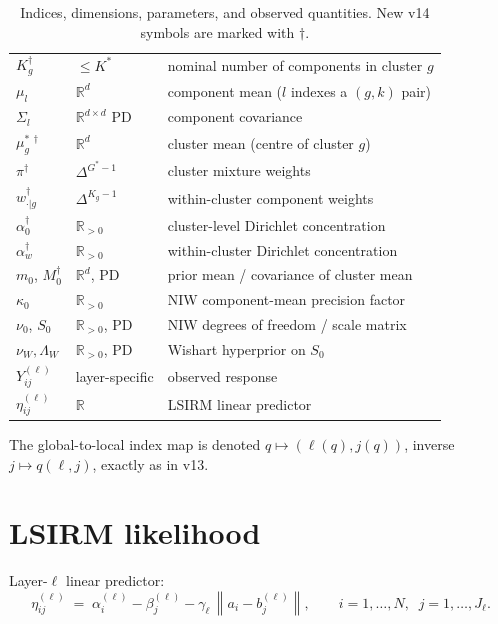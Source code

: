 \documentclass[11pt]{article}
\newcommand{\R}{\mathbb{R}}
\newcommand{\norm}[1]{\left\lVert #1 \right\rVert}
\begin{document}
\begin{table}[H]
\begin{tabular}{l l l}
$K_g^{\dagger}$ & $\le K^*$          & nominal number of components in cluster $g$ \\
$\mu_l$    & $\R^d$                  & component mean ($l$ indexes a $(g,k)$ pair) \\
$\Sigma_l$ & $\R^{d\times d}$ PD     & component covariance \\
$\mu_g^{*\,\dagger}$ & $\R^d$        & cluster mean (centre of cluster $g$) \\
$\pi^{\dagger}$ & $\Delta^{G^*-1}$   & cluster mixture weights \\
$w_{\cdot|g}^{\dagger}$ & $\Delta^{K_g-1}$ & within-cluster component weights \\
$\alpha_0^{\dagger}$ & $\R_{>0}$     & cluster-level Dirichlet concentration \\
$\alpha_w^{\dagger}$ & $\R_{>0}$     & within-cluster Dirichlet concentration \\
$m_0$, $M_0^{\dagger}$ & $\R^d$, PD  & prior mean / covariance of cluster mean \\
$\kappa_0$ & $\R_{>0}$               & NIW component-mean precision factor \\
$\nu_0$, $S_0$ & $\R_{>0}$, PD       & NIW degrees of freedom / scale matrix \\
$\nu_W,\Lambda_W$ & $\R_{>0}$, PD    & Wishart hyperprior on $S_0$ \\
\midrule
$Y_{ij}^{(\ell)}$ & layer-specific  & observed response \\
$\eta_{ij}^{(\ell)}$ & $\R$         & LSIRM linear predictor \\
\bottomrule
\end{tabular}
\caption{Indices, dimensions, parameters, and observed quantities. New
v14 symbols are marked with $\dagger$.}
\label{tab:notation}
\end{table}

The global-to-local index map is denoted $q\mapsto(\ell(q),j(q))$,
inverse $j\mapsto q(\ell,j)$, exactly as in v13.

\section{LSIRM likelihood}
\label{sec:lsirm}

Layer-$\ell$ linear predictor:
\begin{equation}
\eta_{ij}^{(\ell)} \;=\; \alpha_i^{(\ell)} - \beta_j^{(\ell)}
   - \gamma_\ell \,\norm{a_i - b_j^{(\ell)}},
\qquad i=1,\ldots,N,\;\; j=1,\ldots,J_\ell.
\label{eq:eta}
\end{equation}
\end{document}

